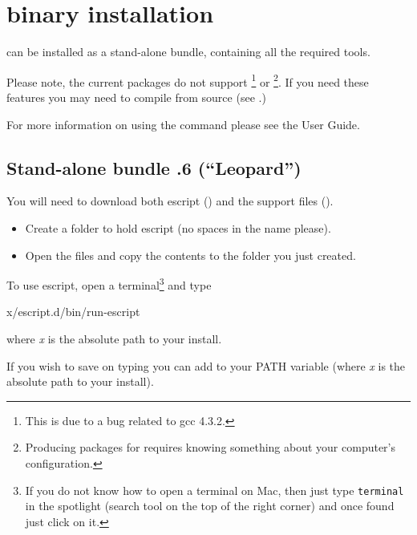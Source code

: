 %
%
%

\section{\macosx binary installation}
\label{sec:binmac}

\esfinley can be installed as a stand-alone bundle, containing all the required tools.

Please note, the current packages do not support \openmp\footnote{This is due to a bug related to gcc 4.3.2.} or \mpi\footnote{Producing packages for \mpi requires knowing something about your computer's configuration.}.
If you need these features you may need to compile \esfinley from source (see .)

For more information on using the  command please see the User Guide.

\subsection{Stand-alone bundle .6 (``Leopard'')}

You will need to download both escript () and the support files ().
\begin{itemize}
\item Create a folder to hold escript (no spaces in the name please).
\item Open the  files and copy the contents to the folder you just created.
\end{itemize}

To use escript, open a terminal\footnote{If you do not know how to open a terminal on Mac, then just type \texttt{terminal} in the spotlight (search tool on the top of the right corner) and once found just click on it.} and type
\begin{shellCode}
x/escript.d/bin/run-escript
\end{shellCode}
where \textit{x} is the absolute path to your install.

If you wish to save on typing you can add  to your PATH variable (where \textit{x} is the absolute path to your install). 

